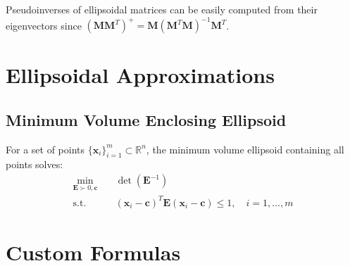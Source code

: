 \documentclass[a4paper,11pt]{article}
\begin{document}
Pseudoinverses of ellipsoidal matrices can be easily computed from their eigenvectors since $(\mathbf{M}\mathbf{M}^T)^+ = \mathbf{M}(\mathbf{M}^T\mathbf{M})^{-1}\mathbf{M}^T$.

\section{Ellipsoidal Approximations}

\subsection{Minimum Volume Enclosing Ellipsoid}
For a set of points $\{\mathbf{x}_i\}_{i=1}^m \subset \mathbb{R}^n$, the minimum volume ellipsoid containing all points solves:
\begin{align}
\min_{\mathbf{E} \succ 0, \mathbf{c}} &\quad \det(\mathbf{E}^{-1}) \\
\text{s.t.} &\quad (\mathbf{x}_i-\mathbf{c})^T \mathbf{E} (\mathbf{x}_i-\mathbf{c}) \leq 1, \quad i=1,\ldots,m
\end{align}

\section{Custom Formulas}
\end{document}
